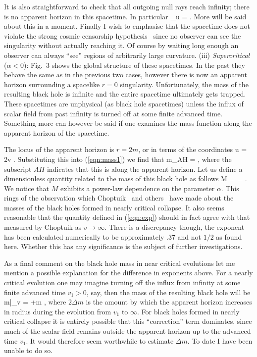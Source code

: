 It is also straightforward to check that all outgoing null rays reach infinity;
there is no apparent horizon in this spacetime. In particular
	\be
	\lim_{u }  = \; .
	\label{eqn:apph}
	\ee
More will be said about this in a moment.  Finally I wish to emphasise that
the spacetime does not violate the
strong cosmic censorship hypothesis~\cite{ref:5} since no observer can see
the singularity without actually reaching it.  Of course by waiting long
enough an observer can always ``see'' regions of arbitrarily large
curvature.
\newline
(iii) {\it Supercritical} ($\alpha <0$):
Fig.~3  shows the global structure of these spacetimes.
In the past they behave the same as in the previous two cases, however there is
now an apparent horizon surrounding a spacelike $r=0$ singularity.
Unfortunately, the mass of the resulting black hole is infinite and the entire
spacetime ultimately gets trapped. These spacetimes are unphysical
(as black hole spacetimes) unless the influx of scalar field from past infinity
is turned off at some finite advanced time. Something more can however be said
if one examines the mass function along the apparent horizon of the spacetime.

The locus of the apparent horizon is $ r=2m $, or in terms of the coordinates
	\be
	u = 2\alpha v \: .
	\ee
Substituting this into (\ref{eqn:mass1}) we find that
	\be
	m_{\rm AH} = \sqrt{-\alpha} \; ,
	\ee
where the subscript $AH$ indicates that this is along the apparent horizon.
Let us define a dimensionless quantity related to the mass of this black hole
as follows
	\be
	M =  = 
	{}  \label{eqn:exp} \; .
	\ee
We notice that $M$ exhibits a power-law dependence on the
parameter $\alpha$.  This rings of the observation which Choptuik~\cite{ref:3}
and others~\cite{ref:6} have made about the masses of the black holes formed in
nearly critical collapse.  It also seems reasonable that the quantity defined
in (\ref{eqn:exp}) should in fact agree with that measured by Choptuik as
$v\rightarrow \infty$.  There is a discrepancy though, the exponent has been
calculated numerically to be approximately $.37$ and not $1/2$ as found here.
Whether this has any significance is the subject of further investigations.

As a final comment on the black hole mass in near critical evolutions
let me mention a possible explanation for the difference in exponents above.
For a nearly critical evolution one may imagine turning off the influx from
infinity at some finite advanced time $v_1 > 0$, say, then  the mass of the
resulting black hole will be
	\be
	 m|_{v\rightarrow \infty} = 
	  \sqrt{-\alpha}\:
	 +\Delta m \; ,
	 \ee
where  $2\Delta m$ is the amount by which the apparent horizon increases in
radius during the evolution from $v_1$ to $\infty$.  For black holes formed in
nearly critical collapse it is entirely possible that this ``correction'' term
dominates,  since much of the scalar field remains outside the apparent horizon
up to the advanced time $v_1$.  It would therefore seem worthwhile to estimate
$\Delta m$.  To date I have been unable to do so.


